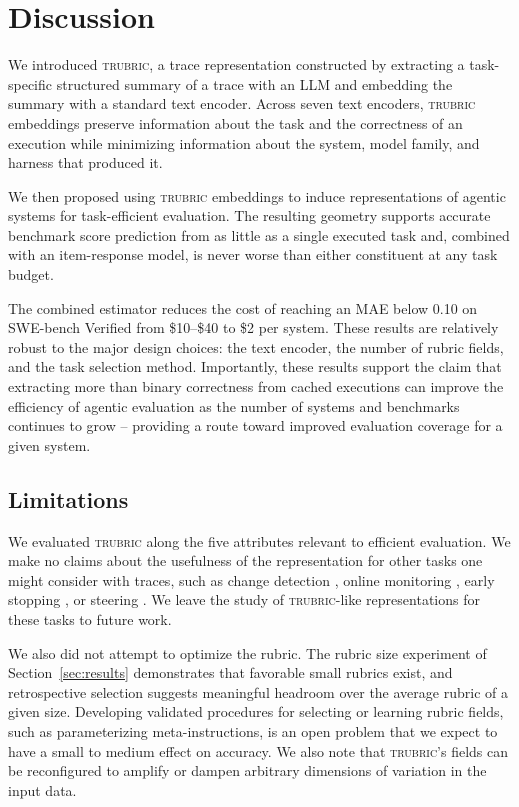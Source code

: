 \documentclass{article}
\newcommand{\trubric}{\textsc{trubric}}
\begin{document}
\section{Discussion}
\label{sec:discussion}

We introduced \trubric{}, a trace representation constructed by extracting a task-specific structured summary of a trace with an LLM and embedding the summary with a standard text encoder.
Across seven text encoders, \trubric{} embeddings preserve information about the task and the correctness of an execution while minimizing information about the system, model family, and harness that produced it.

We then proposed using \trubric{} embeddings to induce representations of agentic systems for task-efficient evaluation.
The resulting geometry supports accurate benchmark score prediction from as little as a single executed task and, combined with an item-response model, is never worse than either constituent at any task budget.

The combined estimator reduces the cost of reaching an MAE below 0.10 on SWE-bench Verified from \$10--\$40 to \$2 per system.
These results are relatively robust to the major design choices: the text encoder, the number of rubric fields, and the task selection method.
Importantly, these results support the claim that extracting more than binary correctness from cached executions can improve the efficiency of agentic evaluation as the number of systems and benchmarks continues to grow -- providing a route toward improved evaluation coverage for a given system.

\subsection{Limitations}

We evaluated \trubric{} along the five attributes relevant to efficient evaluation.
We make no claims about the usefulness of the representation for other tasks one might consider with traces, such as change detection \citep{bridgeford2025perspective}, online monitoring \citep{helm2026control}, early stopping \citep{ruan2026doomed, wang2026failfast}, or steering \citep{rahn2024entropic}.
We leave the study of \trubric{}-like representations for these tasks to future work.

We also did not attempt to optimize the rubric.
The rubric size experiment of Section~\ref{sec:results} demonstrates that favorable small rubrics exist, and retrospective selection suggests meaningful headroom over the average rubric of a given size.
Developing validated procedures for selecting or learning rubric fields, such as parameterizing meta-instructions, is an open problem that we expect to have a small to medium effect on accuracy.
We also note that \trubric{}'s fields can be reconfigured to amplify or dampen arbitrary dimensions of variation in the input data.
\end{document}
